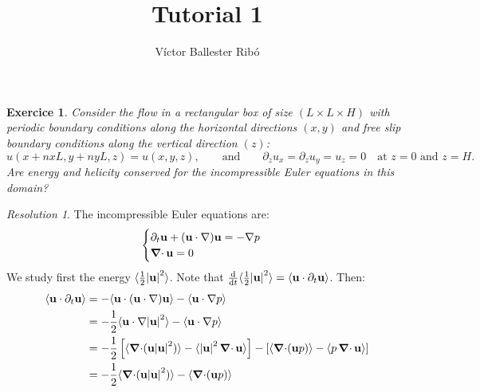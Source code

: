 \documentclass[10pt,a4paper]{article}
\title{\bfseries\Large Tutorial 1}
\author{Víctor Ballester Ribó}
\date{\parbox{\linewidth}{\centering
  Turbulence\endgraf
  M2 Applied and Theoretical Mathematics\endgraf
  Université Paris-Dauphine\endgraf
  January 2024\endgraf}}
\newtheorem{exercici}{Exercice}
\theoremstyle{definition}
\theoremstyle{remark}
\newtheorem*{res}{Resolution}
\begin{document}
\maketitle
\begin{exercici}
  Consider the flow in a rectangular box of size $(L\times L\times H)$ with periodic boundary conditions along the horizontal directions $(x, y)$ and free slip boundary conditions along the vertical direction $(z)$:
  \begin{equation*}
    u(x + nxL, y + ny L, z) = u(x, y, z), \qquad\text{and}\qquad\partial_z{u_x}= \partial_z{u_y} = u_z = 0 \quad \text{at } z = 0 \text{ and } z = H.
  \end{equation*}
  Are energy and helicity conserved for the incompressible Euler equations in this domain?
\end{exercici}
\begin{res}
  The incompressible Euler equations are:
  \begin{equation*}
    \begin{cases}
      \displaystyle\partial_t\boldsymbol{\mathrm{u}} + (\boldsymbol{\mathrm{u}}\cdot\nabla)\boldsymbol{\mathrm{u}} = -\nabla p \\
      \operatorname{\boldsymbol{\mathrm{\nabla}}\cdot}\boldsymbol{\mathrm{u}} = 0
    \end{cases}
  \end{equation*}
  We study first the energy $\langle \frac{1}{2}\abs{\boldsymbol{\mathrm{u}}}^2\rangle$. Note that $\dv{}{t}\langle \frac{1}{2}\abs{\boldsymbol{\mathrm{u}}}^2\rangle = \langle \boldsymbol{\mathrm{u}}\cdot\partial_t\boldsymbol{\mathrm{u}}\rangle$. Then:
  \begin{align*}
    \langle \vf{u}\cdot\partial_t\vf{u}\rangle & = -\langle \vf{u}\cdot(\vf{u}\cdot\nabla)\vf{u}\rangle - \langle \vf{u}\cdot\nabla p\rangle                                                                                        \\
                                               & = -\frac{1}{2}\langle \vf{u}\cdot\nabla\abs{\vf{u}}^2\rangle - \langle \vf{u}\cdot\nabla p\rangle                                                                                  \\
                                               & = -\frac{1}{2}\left[\langle \divp(\vf{u}\abs{\vf{u}}^2)\rangle - \langle \abs{\vf{u}}^2\divp\vf{u}\rangle\right]  - [\langle \divp(\vf{u}p)\rangle  - \langle p\divp\vf{u}\rangle] \\
                                               & = -\frac{1}{2} \langle \divp(\vf{u}\abs{\vf{u}}^2)\rangle - \langle \divp(\vf{u}p)\rangle                                                                                          \\

\end{align*}
\end{res}
\end{document}
